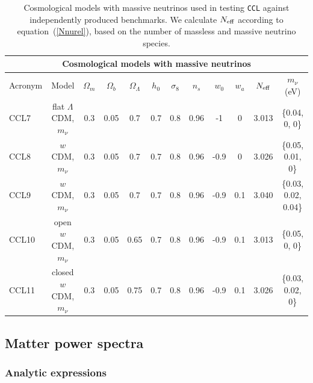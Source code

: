 \documentclass[\docopts]{\docclass}
\newcommand{\ccl}{{\tt CCL}\xspace}
\begin{document}
\begin{table}[t]
  \centering
  \begin{tabular}{ l c | c c c c c c c c c c }
    \hline
    \multicolumn{12}{|c|}{Cosmological models with massive neutrinos} \\
    \hline
    \hline
    Acronym & Model & $\Omega_m$ & $\Omega_b$ & $\Omega_\Lambda$ & $h_0$ & $\sigma_8$ & $n_s$ & $w_0$ & $w_a$ & $N_{\rm eff}$ & $m_\nu$ (eV) \\
    \hline
    CCL7 & flat $\Lambda$CDM, $m_\nu$ & 0.3 & 0.05 & 0.7 & 0.7 & 0.8 & 0.96 & -1 & 0 & 3.013 & \{0.04, 0, 0\} \\
    CCL8 & $w$CDM, $m_\nu$ & 0.3 & 0.05 & 0.7 & 0.7 & 0.8 & 0.96 & -0.9 & 0 & 3.026 & \{0.05, 0.01, 0\} \\
    CCL9 & $w$CDM, $m_\nu$ & 0.3 & 0.05 & 0.7 & 0.7 & 0.8 & 0.96 & -0.9 & 0.1 & 3.040 & \{0.03, 0.02, 0.04\} \\
    CCL10 & open $w$CDM, $m_\nu$ & 0.3 & 0.05 & 0.65 & 0.7 & 0.8 & 0.96 & -0.9 & 0.1 & 3.013 & \{0.05, 0, 0\}  \\
    CCL11 & closed $w$CDM, $m_\nu$ & 0.3 & 0.05 & 0.75 & 0.7 & 0.8 & 0.96 & -0.9 & 0.1 & 3.026 &\{0.03, 0.02, 0\} \\
    \hline
  \end{tabular}
  \caption{Cosmological models with massive neutrinos used in testing \ccl against independently produced benchmarks. We calculate $N_{\rm eff}$ according to equation~(\ref{Nnurel}), based on the number of massless and massive neutrino species.
}
  \label{tab:cosmologies_nu}
\end{table}

\subsection{Matter power spectra}

\subsubsection{Analytic expressions}
\label{ss:bbksval}
\end{document}
